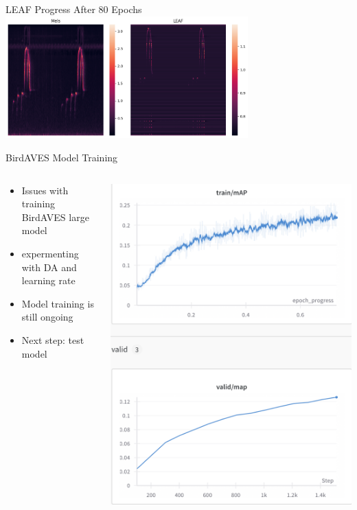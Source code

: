 \begin{frame}{LEAF Progress}
    \centering
    After 80 Epochs
    \break
    \includegraphics[height=0.7\textheight,width=0.7\textwidth,keepaspectratio]{images/LEAF_80.png}
\end{frame}

\begin{frame}{BirdAVES Model Training}
    \begin{columns}
        \begin{column}{0.5\textwidth}
        \begin{itemize}
        \item Issues with training BirdAVES large model
        \item expermenting with DA and learning rate
        \item Model training is still ongoing
        \item Next step: test model
        \end{itemize}
    \end{column}
    \begin{column}{0.5\textwidth}
        \centering
        \includegraphics[height=0.85\textheight,width=1\textwidth,keepaspectratio]{images/BirdAVES_cmap.png} 

\end{column}
\end{columns}
\end{frame}
